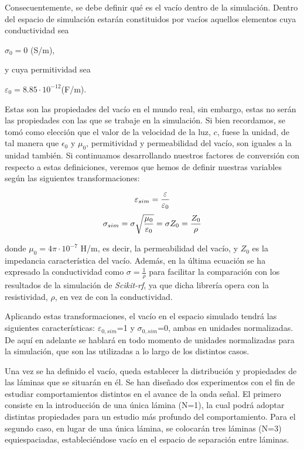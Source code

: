 \documentclass[11pt,a4paper,twoside,pdf]{article}
\numberwithin{equation}{section}
\begin{document}
Consecuentemente, se debe definir qué es el vacío dentro de la simulación. Dentro del espacio de simulación estarán constituidos por vacíos aquellos elementos cuya conductividad sea 
\begin{center}
   $\sigma_0=0$ \;\; (S/m),
\end{center} 
y cuya permitividad sea 
\begin{center}
   $\varepsilon_0=8.85\cdot10^{-12}$\;\;(F/m).
\end{center} 
Estas son las propiedades del vacío en el mundo real, sin embargo, estas no serán las propiedades con las que se trabaje en la simulación. Si bien recordamos, se tomó como elección que el valor de la velocidad de la luz, $c$, fuese la unidad, de tal manera que $\epsilon_0$ y $\mu_0$, permitividad y permeabilidad del vacío, son iguales a la unidad también. Si continuamos desarrollando nuestros factores de conversión con respecto a estas definiciones, veremos que hemos de definir nuestras variables según las siguientes transformaciones:

\begin{equation}
    \varepsilon_{sim}=\frac{\varepsilon}{\varepsilon_0} \notag
\end{equation}
\begin{equation}
   \sigma_{sim}=\sigma\sqrt{\frac{\mu_0}{\varepsilon_0}}=\sigma Z_0=\frac{Z_0}{\rho} \notag
\end{equation}

donde $\mu_0= 4\pi \cdot 10^{-7}$ H/m, es decir, la permeabilidad del vacío, y $Z_0$ es la impedancia característica del vacío. Además, en la última ecuación se ha expresado la conductividad como $\sigma=\frac{1}{\rho}$ para facilitar la comparación con los resultados de la simulación de \textit{Scikit-rf}, ya que dicha librería opera con la resistividad, $\rho$, en vez de con la conductividad.

Aplicando estas transformaciones, el vacío en el espacio simulado tendrá las siguientes características:  $\varepsilon_{0,sim}$=1 y $\sigma_{0,sim}$=0, ambas en unidades normalizadas. De aquí en adelante se hablará en todo momento de unidades normalizadas para la simulación, que son las utilizadas a lo largo de los distintos casos.

Una vez se ha definido el vacío, queda establecer la distribución y propiedades de las láminas que se situarán en él. Se han diseñado dos experimentos con el fin de estudiar comportamientos distintos en el avance de la onda señal. El primero consiste en la introducción de una única lámina (N=1), la cual podrá adoptar distintas propiedades para un estudio más profundo del comportamiento. Para el segundo caso, en lugar de una única lámina, se colocarán tres láminas (N=3) equiespaciadas, estableciéndose vacío en el espacio de separación entre láminas.
\end{document}
